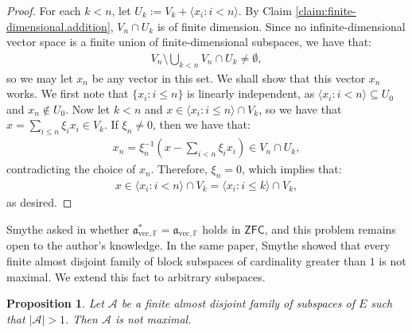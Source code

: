\documentclass[10pt,a4paper]{amsart}
\theoremstyle{plain}
\numberwithin{equation}{section}
\newtheorem{proposition}[theorem]{Proposition}
\theoremstyle{definition}
\renewcommand{\c}[1]{\langle #1 \rangle}
\newcommand{\bb}[1]{\left( #1 \right)}
\newcommand{\cal}{\mathcal}
\renewcommand{\frak}{\mathfrak}
\newcommand{\ZFC}{\mathsf{ZFC}}
\newcommand{\A}{\cal{A}}
\newcommand{\avec}{\frak{a}_{\mathrm{vec},\mathbb{F}}}
\begin{document}
\begin{proof}
    For each $k < n$, let $U_k := V_k + \c{x_i : i < n}$. By Claim \ref{claim:finite-dimensional.addition}, $V_n \cap U_k$ is of finite dimension. Since no infinite-dimensional vector space is a finite union of finite-dimensional subspaces, we have that:
    \begin{align*}
        V_n \setminus \bigcup_{k<n} V_n \cap U_k \neq \emptyset,
    \end{align*}
    so we may let $x_n$ be any vector in this set. We shall show that this vector $x_n$ works. We first note that $\{x_i : i \leq n\}$ is linearly independent, as $\c{x_i : i < n} \subseteq U_0$ and $x_n \notin U_0$. Now let $k < n$ and $x \in \c{x_i : i \leq n} \cap V_k$, so we have that $x = \sum_{i \leq n} \xi_ix_i \in V_k$. If $\xi_n \neq 0$, then we have that:
    \begin{align*}
        x_n = \xi_n^{-1}\bb{x - \sum_{i<n}\xi_i x_i} \in V_n \cap U_k,
    \end{align*}
    contradicting the choice of $x_n$. Therefore, $\xi_n = 0$, which implies that:
    \begin{align*}
        x \in \c{x_i : i < n} \cap V_k = \c{x_i : i \leq k} \cap V_k,
    \end{align*}
    as desired.
\end{proof}

Smythe asked in \cite{S19} whether $\avec^* = \avec$ holds in $\ZFC$, and this problem remains open to the author's knowledge. In the same paper, Smythe showed that every finite almost disjoint family of block subspaces of cardinality greater than $1$ is not maximal. We extend this fact to arbitrary subspaces.

\begin{proposition}
    Let $\A$ be a finite almost disjoint family of subspaces of $E$ such that $|\A| > 1$. Then $\A$ is not maximal.
\end{proposition}
\end{document}
